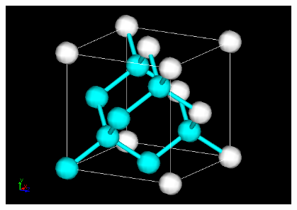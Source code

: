 \documentclass[12pt, dvipdfmx]{beamer}
\begin{document}
\begin{frame}
\begin{columns}[totalwidth=1\textwidth]
\begin{itemize}
				\includegraphics[width=0.8\textwidth]{dia.png}

			\end{itemize}
	\end{columns}
\end{frame}
\end{document}
